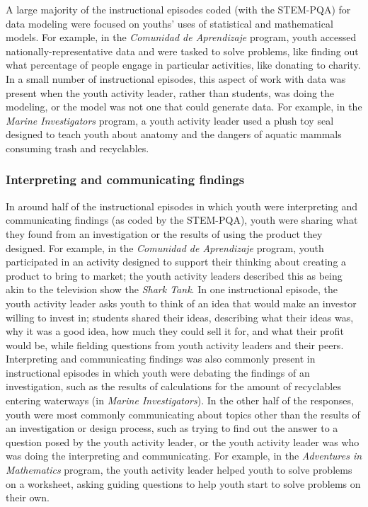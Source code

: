\documentclass[]{msu-thesis}
\theoremstyle{definition}
\theoremstyle{definition}
\theoremstyle{definition}
\theoremstyle{remark}
\begin{document}
A large majority of the instructional episodes coded (with the STEM-PQA)
for data modeling were focused on youths' uses of statistical and
mathematical models. For example, in the \emph{Comunidad de Aprendizaje}
program, youth accessed nationally-representative data and were tasked
to solve problems, like finding out what percentage of people engage in
particular activities, like donating to charity. In a small number of
instructional episodes, this aspect of work with data was present when
the youth activity leader, rather than students, was doing the modeling,
or the model was not one that could generate data. For example, in the
\emph{Marine Investigators} program, a youth activity leader used a
plush toy seal designed to teach youth about anatomy and the dangers of
aquatic mammals consuming trash and recyclables.

\subsubsection{Interpreting and communicating
findings}\label{interpreting-and-communicating-findings}

In around half of the instructional episodes in which youth were
interpreting and communicating findings (as coded by the STEM-PQA),
youth were sharing what they found from an investigation or the results
of using the product they designed. For example, in the \emph{Comunidad
de Aprendizaje} program, youth participated in an activity designed to
support their thinking about creating a product to bring to market; the
youth activity leaders described this as being akin to the television
show the \emph{Shark Tank}. In one instructional episode, the youth
activity leader asks youth to think of an idea that would make an
investor willing to invest in; students shared their ideas, describing
what their ideas was, why it was a good idea, how much they could sell
it for, and what their profit would be, while fielding questions from
youth activity leaders and their peers. Interpreting and communicating
findings was also commonly present in instructional episodes in which
youth were debating the findings of an investigation, such as the
results of calculations for the amount of recyclables entering waterways
(in \emph{Marine Investigators}). In the other half of the responses,
youth were most commonly communicating about topics other than the
results of an investigation or design process, such as trying to find
out the answer to a question posed by the youth activity leader, or the
youth activity leader was who was doing the interpreting and
communicating. For example, in the \emph{Adventures in Mathematics}
program, the youth activity leader helped youth to solve problems on a
worksheet, asking guiding questions to help youth start to solve
problems on their own.
\end{document}
